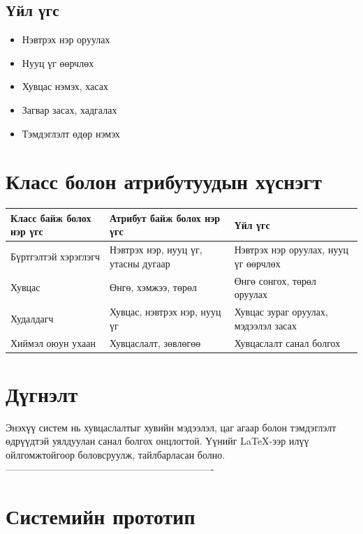 \subsection{Үйл үгс}
\begin{itemize}
    \item Нэвтрэх нэр оруулах
    \item Нууц үг өөрчлөх
    \item Хувцас нэмэх, хасах
    \item Загвар засах, хадгалах
    \item Тэмдэглэлт өдөр нэмэх
\end{itemize}

\section{Класс болон атрибутуудын хүснэгт}

\begin{longtable}{|p{5cm}|p{5cm}|p{5cm}|}
\hline
\textbf{Класс байж болох нэр үгс} & \textbf{Атрибут байж болох нэр үгс} & \textbf{Үйл үгс} \\ \hline
Бүртгэлтэй хэрэглэгч & Нэвтрэх нэр, нууц үг, утасны дугаар & Нэвтрэх нэр оруулах, нууц үг өөрчлөх \\ \hline
Хувцас & Өнгө, хэмжээ, төрөл & Өнгө сонгох, төрөл оруулах \\ \hline
Худалдагч & Хувцас, нэвтрэх нэр, нууц үг & Хувцас зураг оруулах, мэдээлэл засах \\ \hline
Хиймэл оюун ухаан & Хувцаслалт, зөвлөгөө & Хувцаслалт санал болгох \\ \hline
\end{longtable}

\section{Дүгнэлт}
Энэхүү систем нь хувцаслалтыг хувийн мэдээлэл, цаг агаар болон тэмдэглэлт өдрүүдтэй уялдуулан санал болгох онцлогтой. Үүнийг LaTeX-ээр илүү ойлгомжтойгоор боловсруулж, тайлбарласан болно.
----------------------------------------------------------------
\section{Системийн прототип}
